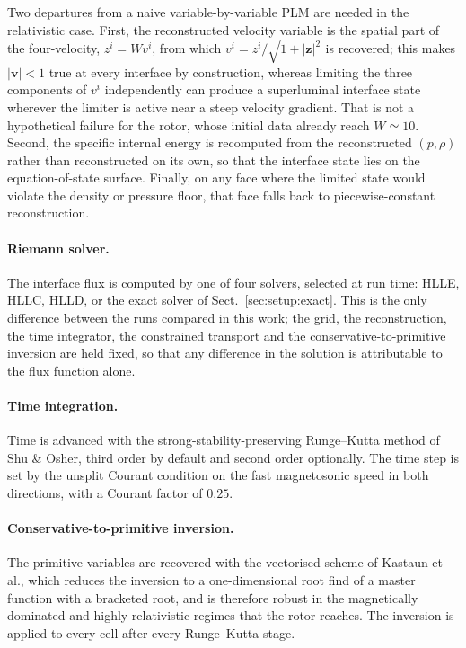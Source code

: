 Two departures from a naive variable-by-variable PLM are needed in the
relativistic case. First, the reconstructed velocity variable is the spatial
part of the four-velocity, $z^i = W v^i$, from which
$v^i = z^i / \sqrt{1 + \lvert \mathbf{z} \rvert^2}$ is recovered; this makes
$\lvert \mathbf{v} \rvert < 1$ true at every interface by construction, whereas
limiting the three components of $v^i$ independently can produce a superluminal
interface state wherever the limiter is active near a steep velocity gradient.
That is not a hypothetical failure for the rotor, whose initial data already
reach $W \simeq 10$. Second, the specific internal energy is recomputed from
the reconstructed $(p, \rho)$ rather than reconstructed on its own, so that the
interface state lies on the equation-of-state surface. Finally, on any face
where the limited state would violate the density or pressure floor, that face
falls back to piecewise-constant reconstruction.

\paragraph{Riemann solver.}
The interface flux is computed by one of four solvers, selected at run time:
HLLE, HLLC, HLLD, or the exact solver of Sect.~\ref{sec:setup:exact}. This is
the only difference between the runs compared in this work; the grid, the
reconstruction, the time integrator, the constrained transport and the
conservative-to-primitive inversion are held fixed, so that any difference in
the solution is attributable to the flux function alone.

\paragraph{Time integration.}
Time is advanced with the strong-stability-preserving Runge--Kutta method of
Shu \& Osher, third order by default and second order optionally. The time
step is set by the unsplit Courant condition on the fast magnetosonic speed
in both directions, with a Courant factor of $0.25$.

\paragraph{Conservative-to-primitive inversion.}
The primitive variables are recovered with the vectorised scheme of
Kastaun et al., which reduces the inversion to a one-dimensional root find of
a master function with a bracketed root, and is therefore robust in the
magnetically dominated and highly relativistic regimes that the rotor reaches.
The inversion is applied to every cell after every Runge--Kutta stage.

